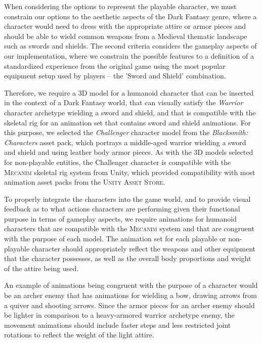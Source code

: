 When considering the options to represent the playable character, we must constrain our options to the aesthetic aspects of the Dark Fantasy genre, where a character would need to dress with the appropriate attire or armor pieces and should be able to wield common weapons from a Medieval thematic landscape such as swords and shields. The second criteria considers the gameplay aspects of our implementation, where we constrain the possible features to a definition of a standardized experience from the original game using the most popular equipment setup used by players -- the 'Sword and Shield' combination.

Therefore, we require a 3D model for a humanoid character that can be inserted in the context of a Dark Fantasy world, that can visually satisfy the \emph{Warrior} character archetype wielding a sword and shield, and that is compatible with the skeletal rig for an animation set that contains sword and shield animations. For this purpose, we selected the \emph{Challenger} character model from the \emph{Blacksmith: Characters} asset pack, which portrays a middle-aged warrior wielding a sword and shield and using leather body armor pieces. As with the 3D models selected for non-playable entities, the Challenger character is compatible with the \textsc{Mecanim} skeletal rig system from Unity, which provided compatibility with most animation asset packs from the \textsc{Unity Asset Store}.

To properly integrate the characters into the game world, and to provide visual feedback as to what actions characters are performing given their functional purpose in terms of gameplay aspects, we require animations for humanoid characters that are compatible with the \textsc{Mecanim} system and that are congruent with the purpose of each model. The animation set for each playable or non-playable character should appropriately reflect the weapons and other equipment that the character possesses, as well as the overall body proportions and weight of the attire being used.

An example of animations being congruent with the purpose of a character would be an archer enemy that has animations for wielding a bow, drawing arrows from a quiver and shooting arrows. Since the armor pieces for an archer enemy should be lighter in comparison to a heavy-armored warrior archetype enemy, the movement animations should include faster steps and less restricted joint rotations to reflect the weight of the light attire.

